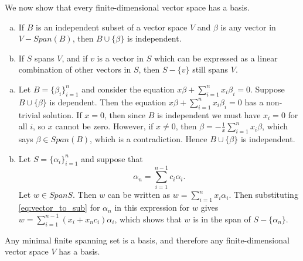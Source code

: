 \documentclass[12pt,letterpaper,reqno]{article}
\numberwithin{equation}{section}
\newcommand{\fixme}[1]{{\color{orange}{[#1]}}}
\begin{document}
\fixme{Include some examples from Anton.}

\fixme{Include geometric interpretation of linear independence.}


We now show that every finite-dimensional vector space has a basis.

\begin{lem}\label{lem:plus_minus_lem}
\begin{enumerate}[(a)]
	\item If $B$ is an independent subset of a vector space $V$ and $\beta$ is any vector in $V-Span(B)$, then $B \cup \{\beta\}$ is independent.
	\item  If $S$ spans $V$, and if $v$ is a vector in $S$ which can be expressed as a linear combination of other vectors in $S$, then $S-\{v\}$ still spans $V$.
\end{enumerate}
	
\end{lem}

\begin{pf}
\begin{enumerate}[(a)]
	\item Let $B=\{\beta_i\}_{i=1}^n$ and consider the equation $x\beta+\sum_{i=1}^nx_i\beta_i=0$. Suppose $B \cup \{\beta\}$ is dependent. Then the equation $x\beta+\sum_{i=1}^nx_i\beta_i=0$ has a non-trivial solution. If $x=0$, then since $B$ is independent we must have $x_i=0$ for all $i$, so $x$ cannot be zero. However, if $x \neq0$, then $\beta=-\frac{1}{x}\sum_{i=1}^nx_i\beta$, which says $\beta \in Span(B)$, which is a contradiction. Hence $B \cup \{\beta\}$ is independent.
	\item Let $S=\{\alpha_i\}_{i=1}^n$ and suppose that 
	\begin{equation}\label{eq:vector_to_sub}
		\alpha_n=\sum_{i=1}^{n-1}c_i\alpha_i.	
	\end{equation}
	 Let $w \in Span S$. Then $w$ can be written as $w=\sum_{i=1}^n x_i\alpha_i$. Then substituting \eqref{eq:vector_to_sub} for $\alpha_n$ in this expression for $w$ gives $w=\sum_{i=1}^{n-1}(x_i+x_nc_i)\alpha_i$, which shows that $w$ is in the span of $S-\{\alpha_n\}$.
\end{enumerate}
	
\end{pf}

\begin{thm}
Any minimal finite spanning set is a basis, and therefore any finite-dimensional vector space $V$ has a basis. 	
\end{thm}
\end{document}
